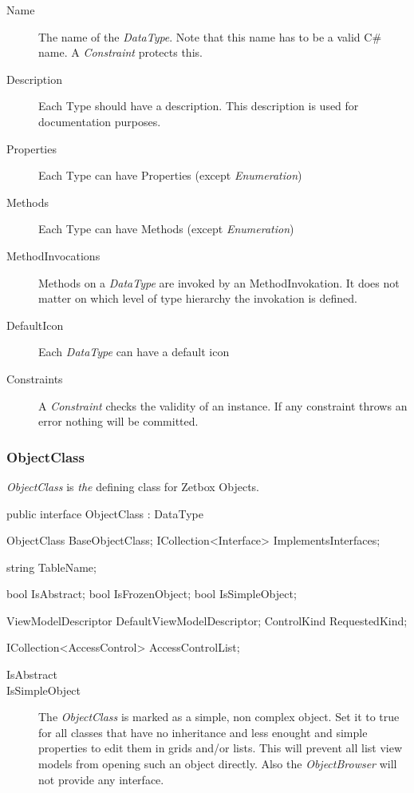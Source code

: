 \begin{description}
\item[Name] { The name of the \emph{DataType}. Note that this name has to be a
valid C\# name. A \emph{Constraint} protects this. }
\item[Description] { Each Type should have a description. This description is
used for documentation purposes. }
\item[Properties] { Each Type can have Properties (except \emph{Enumeration})}
\item[Methods] { Each Type can have Methods (except \emph{Enumeration})}
\item[MethodInvocations] { Methods on a \emph{DataType} are invoked by an
MethodInvokation. It does not matter on which level of type hierarchy the
invokation is defined. }
\item[DefaultIcon] { Each \emph{DataType} can have a default icon}
\item[Constraints] { A \emph{Constraint} checks the validity of an instance. If
any constraint throws an error nothing will be committed. }
\end{description}

\subsubsection{ObjectClass}
\emph{ObjectClass} is \emph{the} defining class for Zetbox Objects.

\begin{CS}
public interface ObjectClass : DataType 
{
    ObjectClass BaseObjectClass;
    ICollection<Interface> ImplementsInterfaces;

    string TableName;

    bool IsAbstract;
    bool IsFrozenObject;
    bool IsSimpleObject;

    ViewModelDescriptor DefaultViewModelDescriptor;
    ControlKind RequestedKind;

    ICollection<AccessControl> AccessControlList;
}
\end{CS}

\begin{description}
\item[IsAbstract]
\item[IsSimpleObject] The \emph{ObjectClass} is marked as a simple, non complex
object. Set it to true for all classes that have no inheritance and less
enought and simple properties to edit them in grids and/or lists. This will
prevent all list view models from opening such an object directly. Also the \emph{ObjectBrowser} will not provide any interface.
\end{description}

